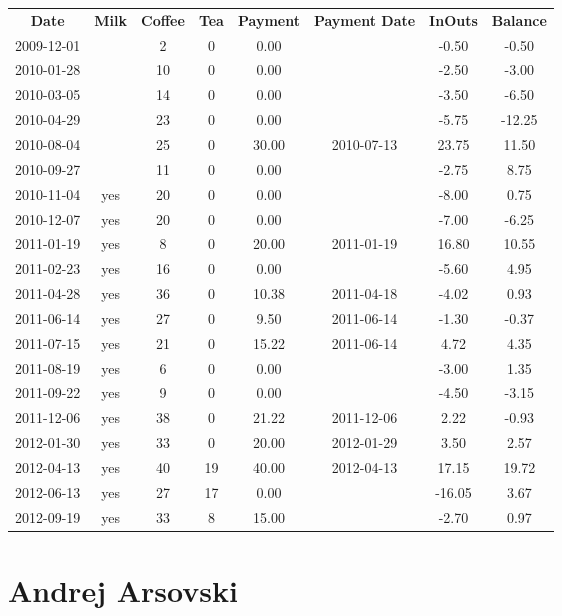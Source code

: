 \begin{center}
\begin{tabular}{cccccccc}
\textbf{Date} & \textbf{Milk} & \textbf{Coffee} & \textbf{Tea} & \textbf{Payment} & \textbf{Payment Date} & \textbf{InOuts} & \textbf{Balance} \\
2009-12-01 &  &  2 &  0 &  0.00 &  &  -0.50 &  -0.50\\ 
2010-01-28 &  & 10 &  0 &  0.00 &  &  -2.50 &  -3.00\\ 
2010-03-05 &  & 14 &  0 &  0.00 &  &  -3.50 &  -6.50\\ 
2010-04-29 &  & 23 &  0 &  0.00 &  &  -5.75 & -12.25\\ 
2010-08-04 &  & 25 &  0 & 30.00 & 2010-07-13 &  23.75 &  11.50\\ 
2010-09-27 &  & 11 &  0 &  0.00 &  &  -2.75 &   8.75\\ 
2010-11-04 & yes & 20 &  0 &  0.00 &  &  -8.00 &   0.75\\ 
2010-12-07 & yes & 20 &  0 &  0.00 &  &  -7.00 &  -6.25\\ 
2011-01-19 & yes &  8 &  0 & 20.00 & 2011-01-19 &  16.80 &  10.55\\ 
2011-02-23 & yes & 16 &  0 &  0.00 &  &  -5.60 &   4.95\\ 
2011-04-28 & yes & 36 &  0 & 10.38 & 2011-04-18 &  -4.02 &   0.93\\ 
2011-06-14 & yes & 27 &  0 &  9.50 & 2011-06-14 &  -1.30 &  -0.37\\ 
2011-07-15 & yes & 21 &  0 & 15.22 & 2011-06-14 &   4.72 &   4.35\\ 
2011-08-19 & yes &  6 &  0 &  0.00 &  &  -3.00 &   1.35\\ 
2011-09-22 & yes &  9 &  0 &  0.00 &  &  -4.50 &  -3.15\\ 
2011-12-06 & yes & 38 &  0 & 21.22 & 2011-12-06 &   2.22 &  -0.93\\ 
2012-01-30 & yes & 33 &  0 & 20.00 & 2012-01-29 &   3.50 &   2.57\\ 
2012-04-13 & yes & 40 & 19 & 40.00 & 2012-04-13 &  17.15 &  19.72\\ 
2012-06-13 & yes & 27 & 17 &  0.00 &  & -16.05 &   3.67\\ 
2012-09-19 & yes & 33 &  8 & 15.00 &  &  -2.70 &   0.97
\end{tabular}
\end{center}

\section{Andrej Arsovski}

